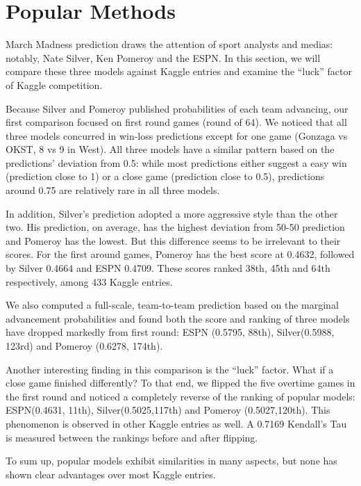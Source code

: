 \documentclass[10pt,a4paper]{article}
\begin{document}
\section{Popular Methods}
March Madness prediction draws the attention of sport analysts and medias: notably, Nate Silver, Ken Pomeroy and the ESPN. In this section, we will compare these three models against Kaggle entries and examine the ``luck'' factor of Kaggle competition.

Because Silver and Pomeroy published probabilities of each team advancing, our first comparison focused on first round games (round of 64).  We noticed that all three models concurred in win-loss predictions except for one game (Gonzaga vs OKST, 8 vs 9 in West). All three models have a similar pattern based on the predictions' deviation from 0.5: while most predictions either suggest a easy win (prediction close to 1) or a close game (prediction close to 0.5), predictions around 0.75 are relatively rare in all three models.

In addition, Silver's prediction adopted a more aggressive style than the other two. His prediction, on average, has the highest deviation from 50-50 prediction and Pomeroy has the lowest. But this difference seems to be irrelevant to their scores. For the first around games, Pomeroy has the best score at 0.4632, followed by Silver 0.4664 and ESPN 0.4709. These scores ranked 38th, 45th and 64th respectively, among 433 Kaggle entries. 

We also computed a full-scale, team-to-team prediction based on the marginal advancement probabilities and found both the score and ranking of three models have dropped markedly from first round: ESPN (0.5795, 88th), Silver(0.5988, 123rd) and Pomeroy (0.6278, 174th). 

Another interesting finding in this comparison is the ``luck'' factor. What if a close game finished differently? To that end, we flipped the five overtime games in the first round and noticed a completely reverse of the ranking of popular models: ESPN(0.4631, 11th), Silver(0.5025,117th) and Pomeroy (0.5027,120th). This phenomenon is observed in other Kaggle entries as well. A 0.7169 Kendall's Tau is measured between the rankings before and after flipping. 

To sum up, popular models exhibit similarities in many aspects,  but none has shown clear advantages over most Kaggle entries. 
 
\end{document}
